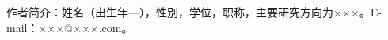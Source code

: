 
\vspace{6pt}
\noindent
\begin{minipage}[t]{2.6cm}
  \centering
\end{minipage}%
\hfill
\begin{minipage}[t]{\dimexpr\linewidth-2.6cm\relax}
  \begingroup
  \setlength{\parindent}{0pt}\baselineskip 12pt\relax
  {\heiti 作者简介：}\songti 姓名（出生年—），性别，学位，职称，主要研究方向为×××。E-mail：×××@×××.com。
  \endgroup
\end{minipage}
